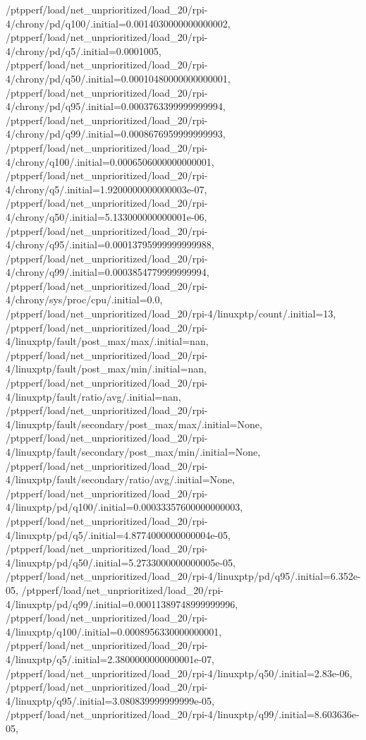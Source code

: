 {    /ptpperf/load/net_unprioritized/load_20/rpi-4/chrony/pd/q100/.initial=0.0014030000000000002,
    /ptpperf/load/net_unprioritized/load_20/rpi-4/chrony/pd/q5/.initial=0.0001005,
    /ptpperf/load/net_unprioritized/load_20/rpi-4/chrony/pd/q50/.initial=0.00010480000000000001,
    /ptpperf/load/net_unprioritized/load_20/rpi-4/chrony/pd/q95/.initial=0.0003763399999999994,
    /ptpperf/load/net_unprioritized/load_20/rpi-4/chrony/pd/q99/.initial=0.0008676959999999993,
    /ptpperf/load/net_unprioritized/load_20/rpi-4/chrony/q100/.initial=0.0006506000000000001,
    /ptpperf/load/net_unprioritized/load_20/rpi-4/chrony/q5/.initial=1.9200000000000003e-07,
    /ptpperf/load/net_unprioritized/load_20/rpi-4/chrony/q50/.initial=5.133000000000001e-06,
    /ptpperf/load/net_unprioritized/load_20/rpi-4/chrony/q95/.initial=0.00013795999999999988,
    /ptpperf/load/net_unprioritized/load_20/rpi-4/chrony/q99/.initial=0.0003854779999999994,
    /ptpperf/load/net_unprioritized/load_20/rpi-4/chrony/sys/proc/cpu/.initial=0.0,
    /ptpperf/load/net_unprioritized/load_20/rpi-4/linuxptp/count/.initial=13,
    /ptpperf/load/net_unprioritized/load_20/rpi-4/linuxptp/fault/post_max/max/.initial=nan,
    /ptpperf/load/net_unprioritized/load_20/rpi-4/linuxptp/fault/post_max/min/.initial=nan,
    /ptpperf/load/net_unprioritized/load_20/rpi-4/linuxptp/fault/ratio/avg/.initial=nan,
    /ptpperf/load/net_unprioritized/load_20/rpi-4/linuxptp/fault/secondary/post_max/max/.initial=None,
    /ptpperf/load/net_unprioritized/load_20/rpi-4/linuxptp/fault/secondary/post_max/min/.initial=None,
    /ptpperf/load/net_unprioritized/load_20/rpi-4/linuxptp/fault/secondary/ratio/avg/.initial=None,
    /ptpperf/load/net_unprioritized/load_20/rpi-4/linuxptp/pd/q100/.initial=0.00033357600000000003,
    /ptpperf/load/net_unprioritized/load_20/rpi-4/linuxptp/pd/q5/.initial=4.8774000000000004e-05,
    /ptpperf/load/net_unprioritized/load_20/rpi-4/linuxptp/pd/q50/.initial=5.2733000000000005e-05,
    /ptpperf/load/net_unprioritized/load_20/rpi-4/linuxptp/pd/q95/.initial=6.352e-05,
    /ptpperf/load/net_unprioritized/load_20/rpi-4/linuxptp/pd/q99/.initial=0.00011389748999999996,
    /ptpperf/load/net_unprioritized/load_20/rpi-4/linuxptp/q100/.initial=0.0008956330000000001,
    /ptpperf/load/net_unprioritized/load_20/rpi-4/linuxptp/q5/.initial=2.3800000000000001e-07,
    /ptpperf/load/net_unprioritized/load_20/rpi-4/linuxptp/q50/.initial=2.83e-06,
    /ptpperf/load/net_unprioritized/load_20/rpi-4/linuxptp/q95/.initial=3.080839999999999e-05,
    /ptpperf/load/net_unprioritized/load_20/rpi-4/linuxptp/q99/.initial=8.603636e-05,
}
